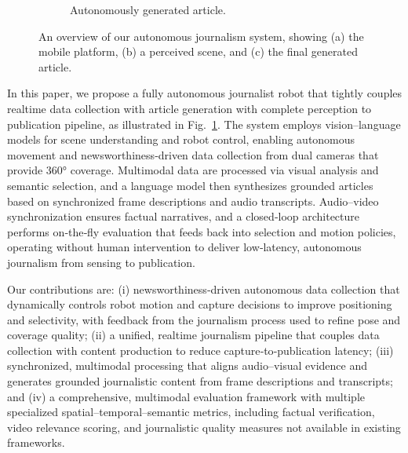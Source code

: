\documentclass[letterpaper, 10 pt, conference]{ieeeconf}  %
\begin{document}
\begin{figure}[!t]
  \vspace{2pt}
  
  \begin{subfigure}{0.95\columnwidth}
    \centering
    \caption{Autonomously generated article.}
  \end{subfigure}
  
  \caption{An overview of our au\-ton\-omous journalism system, showing (a) the mobile platform, (b) a perceived scene, and (c) the final generated article.}
  \label{fig:overview_stack}
\end{figure}



In this paper, we propose a fully au\-ton\-omous journalist robot that tightly couples real\-time data collection with article generation with complete perception to publication pipeline, as illustrated in Fig.~\ref{fig:overview_stack}. The system employs vision–language models for scene understanding and robot control, enabling au\-ton\-omous movement and newsworthi\-ness‑driven data collection from dual cameras that provide 360° coverage. Multi\-modal data are processed via visual analysis and semantic selection, and a language model then synthesizes grounded articles based on synchronized frame descriptions and audio transcripts. Audio–video synchronization ensures factual narratives, and a closed‑loop architecture performs on‑the‑fly evaluation that feeds back into selection and motion policies, operating without human intervention to deliver low‑latency, au\-ton\-omous journalism from sensing to publication.

Our contributions are: (i) newsworthi\-ness‑driven au\-ton\-omous data collection that dynamically controls robot motion and capture decisions to improve positioning and selectivity, with feedback from the journalism process used to refine pose and coverage quality; (ii) a unified, real\-time journalism pipeline that couples data collection with content production to reduce capture‑to‑publication latency; (iii) synchronized, multi\-modal processing that aligns audio–visual evidence and generates grounded jour\-nal\-is\-tic content from frame descriptions and transcripts; and (iv) a comprehensive, multi\-modal evaluation framework with multiple specialized spatial–temporal–semantic metrics, including factual verification, video relevance scoring, and jour\-nal\-is\-tic quality measures not available in existing frameworks.
\end{document}
